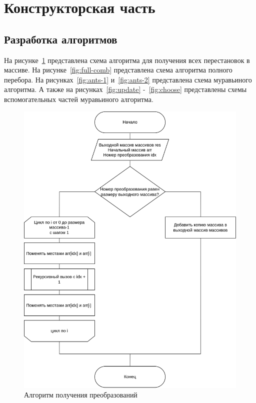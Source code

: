 \section{Конструкторская часть}

\subsection{Разработка алгоритмов}

На рисунке~\ref{fig:perm} представлена схема алгоритма для получения всех перестановок в массиве.
На рисунке~\ref{fig:full-comb} представлена схема алгоритма полного перебора.
На рисунках~\ref{fig:ants-1} и~\ref{fig:ants-2} представлена схема муравьиного алгоритма.
А также на рисунках~\ref{fig:update} -~\ref{fig:choose} представлены схемы вспомогательных частей муравьиного алгоритма.

\begin{figure}[h]
	\centering
	\includegraphics[height=0.65\textheight]{imgs/permutations.drawio}
	\caption{Алгоритм получения преобразований}
	\label{fig:perm}
\end{figure}

